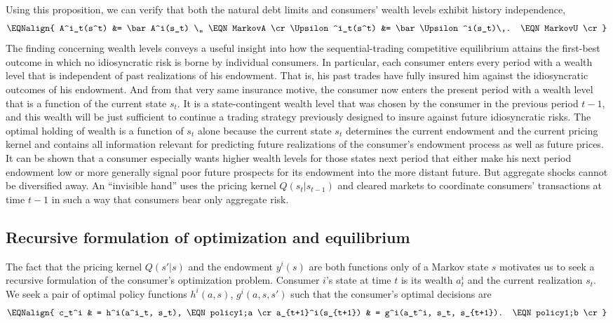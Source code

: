 Using this proposition, we can verify that both the natural debt
limits  and consumers' wealth levels 
exhibit history independence,
$$\EQNalign{
 A^i_t(s^t) &= \bar A^i(s_t) \,,              \EQN MarkovA \cr
 \Upsilon^i_t(s^t) &= \bar \Upsilon^i(s_t)\,. \EQN MarkovU \cr}
$$
The finding concerning wealth levels  conveys a  useful
insight into how the sequential-trading competitive equilibrium
attains the first-best outcome in which no idiosyncratic risk is
borne by individual consumers. In particular, each consumer
enters every period with a wealth level that is independent of
past realizations of his endowment. That is, his past trades have
fully insured him against the idiosyncratic outcomes of his
endowment. And from that very same insurance motive, the consumer
now enters the present period with a wealth level that is a
function of the current state $s_t$. It is a state-contingent
wealth level that was chosen by the consumer in the previous
period $t-1$, and this wealth will be just sufficient to
continue  a trading strategy previously designed to insure against future
idiosyncratic risks. The optimal holding of wealth is  a function
 of $s_t$ alone because the current state $s_t$ determines the
current endowment and the current pricing kernel  and contains all information
relevant for predicting
future realizations of the consumer's endowment process as well as future prices. It can
be shown that a consumer especially wants  higher wealth levels for
those states next period that  either  make his next period
endowment low or more generally  signal poor future prospects for its endowment into
the more distant future.
But aggregate shocks cannot be diversified away. An ``invisible hand''
uses the pricing kernel
$Q(s_t\vert s_{t-1})$ and  cleared  markets
to  coordinate consumers'
transactions at time $t-1$  in such a way  that consumers bear  only aggregate
risk.




\subsection{Recursive formulation of optimization and equilibrium}
The fact  that the pricing kernel $Q(s'|s)$ and the endowment $y^i(s)$
are both functions only of a Markov state $s$ motivates us to seek a
recursive formulation of the consumer's optimization problem.
Consumer $i$'s state at time $t$ is its wealth $a^i_t$ and the
current realization $s_t$. We seek a pair of optimal policy
functions $h^i(a,s)$, $g^i(a,s,s')$ such that the consumer's
optimal decisions are
$$\EQNalign{ c_t^i  & = h^i(a^i_t, s_t),   \EQN policy1;a \cr
         a_{t+1}^i(s_{t+1}) & = g^i(a_t^i, s_t, s_{t+1}). \EQN policy1;b
  \cr} $$


